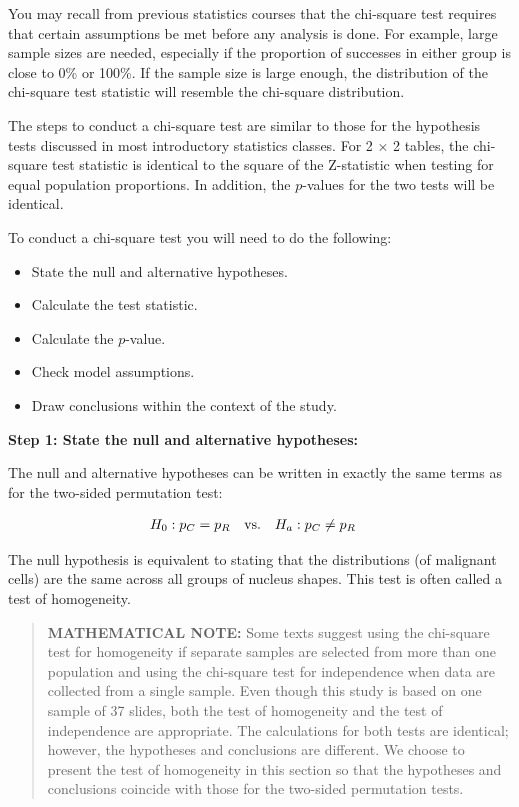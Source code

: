 \documentclass[
]{report}
\begin{document}
You may recall from previous statistics courses that the chi-square test requires that certain assumptions be met before any analysis is done. For example, large sample sizes are needed, especially if the proportion of successes in either group is close to 0\% or 100\%. If the sample size is large enough, the distribution of the chi-square test statistic will resemble the chi-square distribution.

The steps to conduct a chi-square test are similar to those for the hypothesis tests discussed in most introductory statistics classes. For 2 × 2 tables, the chi-square test statistic is identical to the square of the Z-statistic when testing for equal population proportions. In addition, the \(\scriptstyle p\)-values for the two tests will be identical.

To conduct a chi-square test you will need to do the following:
\vspace{-1em}

\begin{itemize}
\item  State the null and alternative hypotheses.
\item Calculate the test statistic.
\item Calculate the $\scriptstyle p$-value.
\item Check model assumptions.
\item Draw conclusions within the context of the study.
\end{itemize}

\textbf{Step 1: State the null and alternative hypotheses:}

The null and alternative hypotheses can be written in exactly the same terms as for the two-sided permutation test:

\begin{align}
H_0: p_C &= p_R \quad\text{vs.}\quad H_a: p_C \neq p_R 
\notag
\end{align}

The null hypothesis is equivalent to stating that the distributions (of malignant cells) are the same across all groups of nucleus shapes. This test is often called a test of homogeneity.

\begin{quote}
\textbf{MATHEMATICAL NOTE:} Some texts suggest using the chi-square test for homogeneity if separate samples are selected from more than one population and using the chi-square test for independence when data are collected from
a single sample. Even though this study is based on one sample of 37 slides, both the test of homogeneity and the test of independence are appropriate. The calculations
for both tests are identical; however, the hypotheses and conclusions are different. We choose to present the test of homogeneity in this section so that the hypotheses and conclusions coincide with those for the
two-sided permutation tests.
\end{quote}
\end{document}
